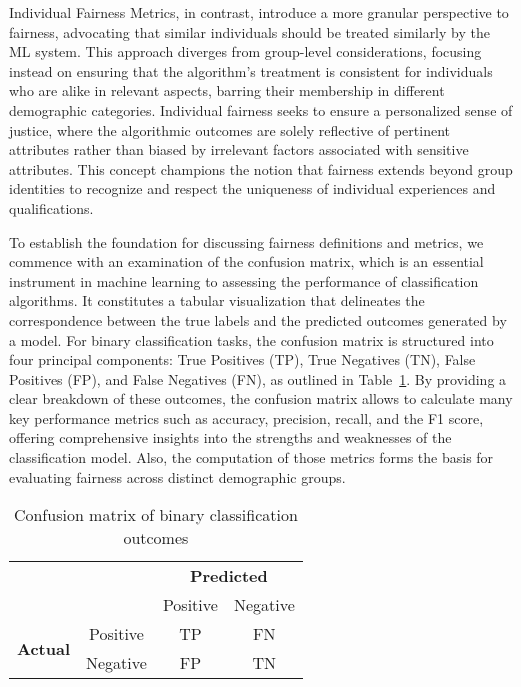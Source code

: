 Individual Fairness Metrics, in contrast, introduce a more granular perspective to fairness, advocating that similar individuals should be treated similarly by the ML system. This approach diverges from group-level considerations, focusing instead on ensuring that the algorithm’s treatment is consistent for individuals who are alike in relevant aspects, barring their membership in different demographic categories. Individual fairness seeks to ensure a personalized sense of justice, where the algorithmic outcomes are solely reflective of pertinent attributes rather than biased by irrelevant factors associated with sensitive attributes. This concept champions the notion that fairness extends beyond group identities to recognize and respect the uniqueness of individual experiences and qualifications.

To establish the foundation for discussing fairness definitions and metrics, we commence with an examination of the confusion matrix, which is an essential instrument in machine learning to assessing the performance of classification algorithms. It constitutes a tabular visualization that delineates the correspondence between the true labels and the predicted outcomes generated by a model. For binary classification tasks, the confusion matrix is structured into four principal components: True Positives (TP), True Negatives (TN), False Positives (FP), and False Negatives (FN), as outlined in Table~\ref{tab:confusion_matrix_definition}. By providing a clear breakdown of these outcomes, the confusion matrix allows to calculate many key performance metrics such as accuracy, precision, recall, and the F1 score, offering comprehensive insights into the strengths and weaknesses of the classification model. Also, the computation of those metrics forms the basis for evaluating fairness across distinct demographic groups. 

\begin{table}[h]
    \centering
    \caption{Confusion matrix of binary classification outcomes} \label{tab:confusion_matrix_definition}
    \begin{tabular}{cc|c|c|}
    \cline{3-4}
     & & \multicolumn{2}{c|}{\textbf{Predicted}} \\ \cline{3-4}
     & & Positive & Negative \\ \hline
    \multicolumn{1}{|c|}{\multirow{2}{*}{\textbf{Actual}}} & Positive & TP & FN \\ \cline{2-4}
    \multicolumn{1}{|c|}{} & Negative & FP & TN \\ \hline
    \end{tabular}
\end{table}


